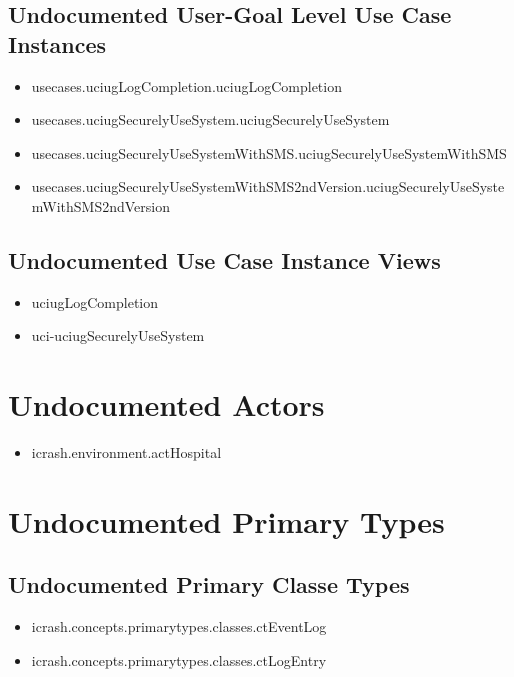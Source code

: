 \subsection[Undocumented Use Case Instances - User-Goal Level]{Undocumented User-Goal Level Use Case Instances}
\begin{itemize}
\item usecases.uciugLogCompletion.uciugLogCompletion 
\item usecases.uciugSecurelyUseSystem.uciugSecurelyUseSystem 
\item usecases.uciugSecurelyUseSystemWithSMS.uciugSecurelyUseSystemWithSMS 
\item usecases.uciugSecurelyUseSystemWithSMS2ndVersion.uciugSecurelyUseSystemWithSMS2ndVersion 
\end{itemize}


\subsection[Undocumented Use Case Instance Views]{Undocumented Use Case Instance Views}
\begin{itemize}
\item uciugLogCompletion 
\item uci-uciugSecurelyUseSystem 
\end{itemize}


\section[Undocumented Actors]{Undocumented Actors}
\begin{itemize}
\item icrash.environment.actHospital 
\end{itemize}




\section[Undocumented Primary Types]{Undocumented Primary Types}

\subsection[Undocumented Primary Classe Types]{Undocumented Primary Classe Types}
\begin{itemize}
\item icrash.concepts.primarytypes.classes.ctEventLog 
\item icrash.concepts.primarytypes.classes.ctLogEntry 
\end{itemize}

